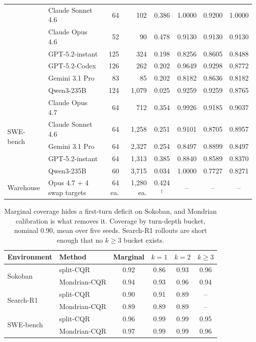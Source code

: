\documentclass{article}
\begin{document}
\begin{table}[t]
\begin{tabular}{@{}llrrcccc@{}}
 & Claude Sonnet 4.6 & 64 & 102 & 0.386 & 1.0000 & 0.9200 & 1.0000 \\
 & Claude Opus 4.6 & 52 & 90 & 0.478 & 0.9130 & 0.9130 & 0.9130 \\
 & GPT-5.2-instant & 125 & 324 & 0.198 & 0.8256 & 0.8605 & 0.8488 \\
 & GPT-5.2-Codex & 126 & 262 & 0.202 & 0.9649 & 0.9298 & 0.8772 \\
 & Gemini 3.1 Pro & 83 & 85 & 0.202 & 0.8182 & 0.8636 & 0.8182 \\
 & Qwen3-235B & 124 & 1{,}079 & 0.025 & 0.9259 & 0.9259 & 0.8765 \\
\midrule
\multirow{5}{*}{SWE-bench}
 & Claude Opus 4.7 & 64 & 712 & 0.354 & 0.9926 & 0.9185 & 0.9037 \\
 & Claude Sonnet 4.6 & 64 & 1{,}258 & 0.251 & 0.9101 & 0.8705 & 0.8957 \\
 & Gemini 3.1 Pro & 64 & 2{,}327 & 0.254 & 0.8497 & 0.8899 & 0.8497 \\
 & GPT-5.2-instant & 64 & 1{,}313 & 0.385 & 0.8840 & 0.8589 & 0.8370 \\
 & Qwen3-235B & 60 & 3{,}715 & 0.034 & 1.0000 & 0.7727 & 0.8271 \\
\midrule
Warehouse & Opus 4.7 $+$ 4 swap targets & 64 ea. & 1{,}280 ea. & 0.424$^{\dagger}$ & -- & -- & -- \\
\bottomrule
\end{tabular}
\end{table}

\begin{table}[t]
\centering
\caption{Marginal coverage hides a first-turn deficit on Sokoban, and Mondrian calibration is what removes it. Coverage by turn-depth bucket, nominal 0.90, mean over five seeds. Search-R1 rollouts are short enough that no $k{\ge}3$ bucket exists.}
\label{tab:conditional}
\small
\begin{tabular}{@{}llcccc@{}}
\toprule
Environment & Method & Marginal & $k{=}1$ & $k{=}2$ & $k{\ge}3$ \\
\midrule
\multirow{2}{*}{Sokoban}
 & split-CQR & 0.92 & 0.86 & 0.93 & 0.96 \\
 & Mondrian-CQR & 0.94 & 0.93 & 0.96 & 0.94 \\
\midrule
\multirow{2}{*}{Search-R1}
 & split-CQR & 0.90 & 0.91 & 0.89 & -- \\
 & Mondrian-CQR & 0.89 & 0.89 & 0.89 & -- \\
\midrule
\multirow{2}{*}{SWE-bench}
 & split-CQR & 0.96 & 0.99 & 0.99 & 0.95 \\
 & Mondrian-CQR & 0.97 & 0.99 & 0.99 & 0.96 \\
\bottomrule
\end{tabular}
\end{table}
\end{document}
